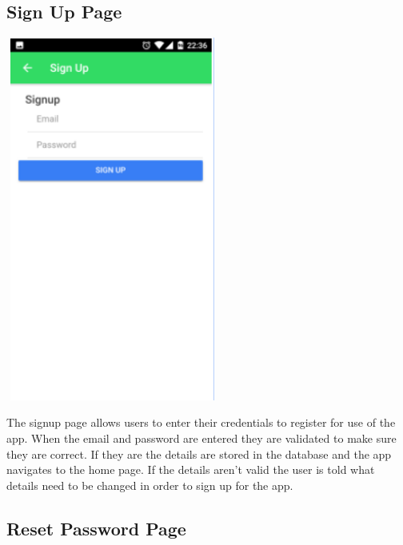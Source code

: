 \subsection{Sign Up Page}

\begin{center}    
	\includegraphics[width=7cm, height=12cm]{img/signup.png}
\end{center}
The signup page allows users to enter their credentials to register for use of the app. When the email and password are entered they are validated to make sure they are correct. If they are the details are stored in the database and the app navigates to the home page. If the details aren’t valid the user is told what details need to be changed in order to sign up for the app.

\subsection{Reset Password Page}

